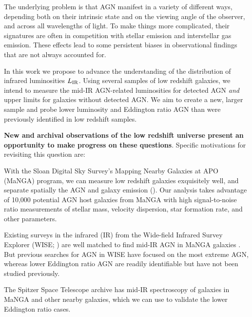 \documentclass[12pt, preprint]{hacked-aastex}
\newlength{\mylen}
\newenvironment{ditemize}
{ \begin{list}{}{%
\setlength{\topsep}{0pt}%
\setlength{\partopsep}{3pt}%
\setlength{\itemsep}{1pt}\setlength{\parsep}{1pt}%
\setlength{\itemindent}{0pt}\setlength{\listparindent}{12pt}%
\setlength{\leftmargin}{24pt}\setlength{\rightmargin}{0in}%
\setlength{\labelsep}{3pt}\setlength{\labelwidth}{6pt}%
\setlength{\mylen}{3pt}
\renewcommand{\makelabel}{\makebox[\labelwidth][l]{\raisebox{\mylen}{\tiny$\bullet$}\hspace{\fill}}}}}
{\end{list}}
\begin{document}
The underlying problem is that AGN manifest in a variety of different
ways, depending both on their intrinsic state and on the viewing angle
of the observer, and across all wavelengths of light.  To make things
more complicated, their signatures are often in competition with
stellar emission and interstellar gas emission. These effects lead to
some persistent biases in observational findings that are not always
accounted for.

In this work we propose to advance the understanding of the
distribution of infrared luminosities $L_{\rm IR}$. Using several
samples of low redshift galaxies, we intend to measure the mid-IR
AGN-related luminosities for detected AGN {\it and} upper limits for
galaxies without detected AGN. We aim to create a new, larger sample
and probe lower luminosity and Eddington ratio AGN than were
previously identified in low redshift samples.

{\bf New and archival observations of the low redshift universe
  present an opportunity to make progress on these
  questions}. Specific motivations for revisiting this question are:
\begin{ditemize}
\item With the Sloan Digital Sky Survey's Mapping Nearby Galaxies at
  APO (MaNGA) program, we can measure low redshift galaxies
  exquisitely well, and separate spatially the AGN and galaxy emission
  (\cite{bundy15a, blanton17a}).  Our analysis takes advantage of
  10,000 potential AGN host galaxies from MaNGA with high
  signal-to-noise ratio measurements of stellar mass, velocity
  dispersion, star formation rate, and other parameters.
\item Existing surveys in the infrared (IR) from the Wide-field
  Infrared Survey Explorer (WISE; \cite{wright10a}) are well matched
  to find mid-IR AGN in MaNGA galaxies \cite{comerford20a}. But
  previous searches for AGN in WISE have focused on the most extreme
  AGN, whereas lower Eddington ratio AGN are readily identifiable but
  have not been studied previously.
\item The Spitzer Space Telescope archive has mid-IR spectroscopy of
  galaxies in MaNGA and other nearby galaxies, which we can use to
  validate the lower Eddington ratio cases.
\end{ditemize}
\end{document}
